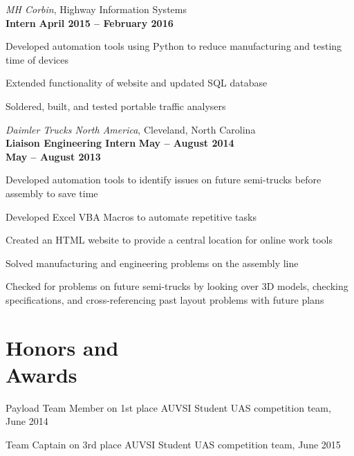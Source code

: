 \documentclass[margin,line]{resume}
\begin{document}
\begin{resume}
    \textsl{MH Corbin}, Highway Information Systems\\
    \textbf{Intern}  \hfill \textbf{April 2015 -- February 2016} \\
    \vspace{-4mm}
    \begin{list2}
    \item Developed automation tools using Python to reduce manufacturing and testing time of devices
    \item Extended functionality of website and updated SQL database
    \item Soldered, built, and tested portable traffic analysers
    \end{list2}
    \vspace{3mm}



    \textsl{Daimler Trucks North America}, Cleveland, North Carolina \\
    \textbf{Liaison Engineering Intern} \hfill \textbf{May -- August 2014}\\
    \vspace{1mm}
    \hfill \textbf{May -- August 2013}\\
    \vspace{-4mm}
    \begin{list2}
    \item Developed automation tools to identify issues on future semi-trucks before assembly to save time
    \item Developed Excel VBA Macros to automate repetitive tasks
    \item Created an HTML website to provide a central location for online work tools
    \item Solved manufacturing and engineering problems on the assembly line
    \item Checked for problems on future semi-trucks by looking over 3D models, checking specifications, and cross-referencing past layout problems with future plans
    \end{list2}
    \vspace{2mm}


    \section{\mysidestyle Honors and\\Awards}

    Payload Team Member on 1st place AUVSI Student UAS competition team, June 2014\\
	\vspace{-8mm}

	Team Captain on 3rd place AUVSI Student UAS competition team, June 2015\\
	\vspace{-8mm}

\end{resume}
\end{document}
